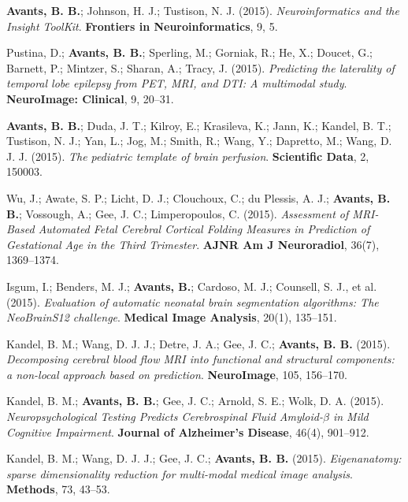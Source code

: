 \documentclass[10pt,letterpaper]{article}
\begin{document}
\begin{enumerate}
{  %
  \item \textbf{Avants, B. B.}; Johnson, H. J.; Tustison, N. J. (2015). \textit{Neuroinformatics and the Insight ToolKit}. \textbf{Frontiers in Neuroinformatics}, 9, 5.
  \item Pustina, D.; \textbf{Avants, B. B.}; Sperling, M.; Gorniak, R.; He, X.; Doucet, G.; Barnett, P.; Mintzer, S.; Sharan, A.; Tracy, J. (2015). \textit{Predicting the laterality of temporal lobe epilepsy from PET, MRI, and DTI: A multimodal study}. \textbf{NeuroImage: Clinical}, 9, 20--31.
  \item \textbf{Avants, B. B.}; Duda, J. T.; Kilroy, E.; Krasileva, K.; Jann, K.; Kandel, B. T.; Tustison, N. J.; Yan, L.; Jog, M.; Smith, R.; Wang, Y.; Dapretto, M.; Wang, D. J. J. (2015). \textit{The pediatric template of brain perfusion}. \textbf{Scientific Data}, 2, 150003.
  \item Wu, J.; Awate, S. P.; Licht, D. J.; Clouchoux, C.; du Plessis, A. J.; \textbf{Avants, B. B.}; Vossough, A.; Gee, J. C.; Limperopoulos, C. (2015). \textit{Assessment of MRI-Based Automated Fetal Cerebral Cortical Folding Measures in Prediction of Gestational Age in the Third Trimester}. \textbf{AJNR Am J Neuroradiol}, 36(7), 1369--1374.
  \item Isgum, I.; Benders, M. J.; \textbf{Avants, B.}; Cardoso, M. J.; Counsell, S. J., et al. (2015). \textit{Evaluation of automatic neonatal brain segmentation algorithms: The NeoBrainS12 challenge}. \textbf{Medical Image Analysis}, 20(1), 135--151.
  \item Kandel, B. M.; Wang, D. J. J.; Detre, J. A.; Gee, J. C.; \textbf{Avants, B. B.} (2015). \textit{Decomposing cerebral blood flow MRI into functional and structural components: a non-local approach based on prediction}. \textbf{NeuroImage}, 105, 156--170.
  \item Kandel, B. M.; \textbf{Avants, B. B.}; Gee, J. C.; Arnold, S. E.; Wolk, D. A. (2015). \textit{Neuropsychological Testing Predicts Cerebrospinal Fluid Amyloid-$\beta$ in Mild Cognitive Impairment}. \textbf{Journal of Alzheimer's Disease}, 46(4), 901--912.
  \item Kandel, B. M.; Wang, D. J. J.; Gee, J. C.; \textbf{Avants, B. B.} (2015). \textit{Eigenanatomy: sparse dimensionality reduction for multi-modal medical image analysis}. \textbf{Methods}, 73, 43--53.

}
\end{enumerate}
\end{document}

